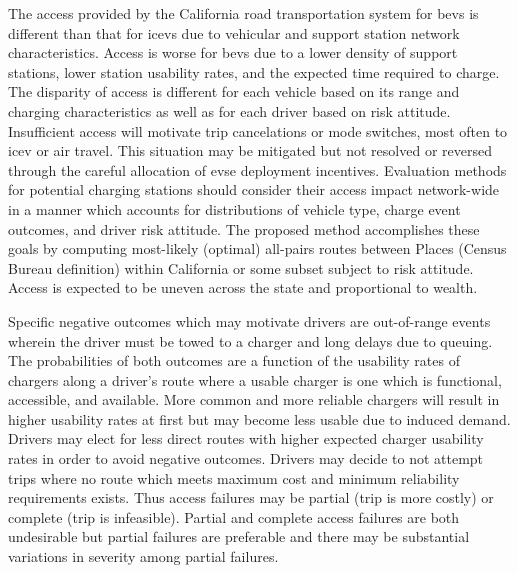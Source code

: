 \documentclass[12pt]{article}
\begin{document}
The access provided by the California road transportation system for \glspl{bev} is different than that for \glspl{icev} due to vehicular and support station network characteristics. Access is worse for \glspl{bev} due to a lower density of support stations, lower station usability rates, and the expected time required to charge. The disparity of access is different for each vehicle based on its range and charging characteristics as well as for each driver based on risk attitude. Insufficient access will motivate trip cancelations or mode switches, most often to \gls{icev} or air travel. This situation may be mitigated but not resolved or reversed through the careful allocation of \gls{evse} deployment incentives. Evaluation methods for potential charging stations should consider their access impact network-wide in a manner which accounts for distributions of vehicle type, charge event outcomes, and driver risk attitude. The proposed method accomplishes these goals by computing most-likely (optimal) all-pairs routes between Places (Census Bureau definition) within California or some subset subject to risk attitude. Access is expected to be uneven across the state and proportional to wealth.

Specific negative outcomes which may motivate drivers are out-of-range events wherein the driver must be towed to a charger and long delays due to queuing. The probabilities of both outcomes are a function of the usability rates of chargers along a driver's route where a usable charger is one which is functional, accessible, and available. More common and more reliable chargers will result in higher usability rates at first but may become less usable due to induced demand. Drivers may elect for less direct routes with higher expected charger usability rates in order to avoid negative outcomes. Drivers may decide to not attempt trips where no route which meets maximum cost and minimum reliability requirements exists. Thus access failures may be partial (trip is more costly) or complete (trip is infeasible). Partial and complete access failures are both undesirable but partial failures are preferable and there may be substantial variations in severity among partial failures.
\end{document}
